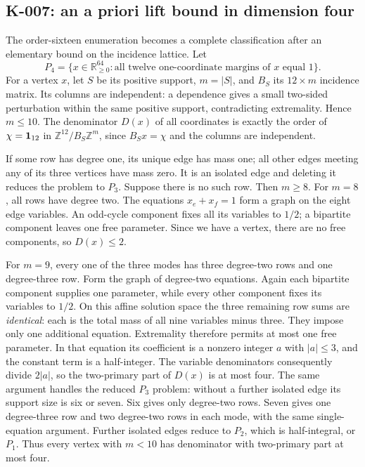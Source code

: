 \subsection{K-007: an a priori lift bound in dimension four}
The order-sixteen enumeration becomes a complete classification after
an elementary bound on the incidence lattice. Let
\[
 P_4=\{x\in\mathbb R_{\ge0}^{64}:\text{all twelve one-coordinate
 margins of }x\text{ equal }1\}.
\]
For a vertex $x$, let $S$ be its positive support, $m=|S|$, and
$B_S$ its $12\times m$ incidence matrix. Its columns are independent:
a dependence gives a small two-sided perturbation within the same
positive support, contradicting extremality. Hence $m\le10$.
The denominator $D(x)$ of all coordinates is exactly the order of
$\chi={\bf1}_{12}$ in
$\mathbb Z^{12}/B_S\mathbb Z^m$, since
$B_Sx=\chi$ and the columns are independent.

If some row has degree one, its unique edge has mass one; all other
edges meeting any of its three vertices have mass zero. It is an
isolated edge and deleting it reduces the problem to $P_3$.
Suppose there is no such row. Then $m\ge8$.
For $m=8$, all rows have degree two. The equations $x_e+x_f=1$
form a graph on the eight edge variables. An odd-cycle component
fixes all its variables to $1/2$; a bipartite component leaves one
free parameter. Since we have a vertex, there are no free components,
so $D(x)\le2$.

For $m=9$, every one of the three modes has three degree-two rows
and one degree-three row. Form the graph of degree-two equations.
Again each bipartite component supplies one parameter, while every
other component fixes its variables to $1/2$. On this affine solution
space the three remaining row sums are \emph{identical}: each is the
total mass of all nine variables minus three. They impose only one
additional equation. Extremality therefore permits at most one free
parameter. In that equation its coefficient is a nonzero integer
$a$ with $|a|\le3$, and the constant term is a half-integer. The
variable denominators consequently divide $2|a|$, so the two-primary
part of $D(x)$ is at most four.
The same argument handles the reduced $P_3$ problem: without a
further isolated edge its support size is six or seven. Six gives
only degree-two rows. Seven gives one degree-three row and two
degree-two rows in each mode, with the same single-equation argument.
Further isolated edges reduce to $P_2$, which is half-integral, or
$P_1$. Thus every vertex with $m<10$ has denominator with two-primary
part at most four.


